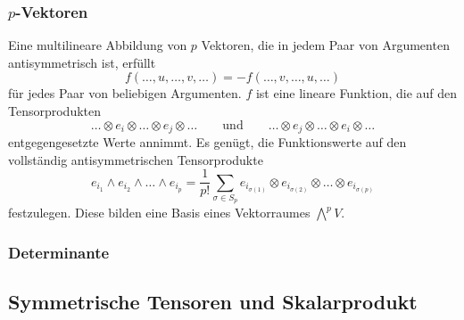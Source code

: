 \subsubsection{$p$-Vektoren}
Eine multilineare Abbildung von $p$ Vektoren, die in jedem Paar von
Argumenten antisymmetrisch ist, erfüllt
\[
f(\dots,u,\dots,v,\dots)
=
-f(\dots,v,\dots,u,\dots)
\]
für jedes Paar von beliebigen Argumenten.
$f$ ist eine lineare Funktion, die auf den Tensorprodukten
\[
\dots\otimes e_i\otimes\dots\otimes e_j\otimes\dots
\qquad\text{und}\qquad
\dots\otimes e_j\otimes\dots\otimes e_i\otimes\dots
\]
entgegengesetzte Werte annimmt.
Es genügt, die Funktionswerte auf den vollständig antisymmetrischen
Tensorprodukte 
\[
e_{i_1}\wedge e_{i_2}\wedge\dots\wedge e_{i_p}
=
\frac1{p!}
\sum_{\sigma\in S_p}
e_{i_{\sigma(1)}}\otimes e_{i_{\sigma(2)}}\otimes\dots\otimes e_{i_{\sigma(p)}}
\]
festzulegen.
Diese bilden eine Basis eines Vektorraumes $\bigwedge^p V$.

\subsubsection{Determinante}

\subsection{Symmetrische Tensoren und Skalarprodukt}






